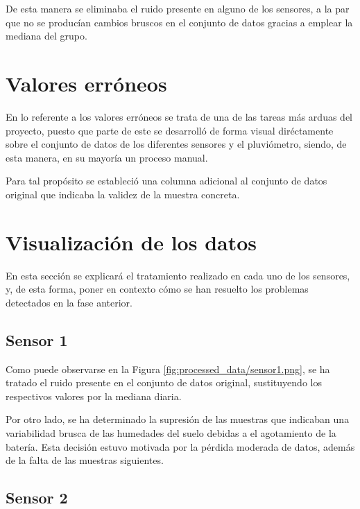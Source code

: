 
De esta manera se eliminaba el ruido presente en alguno de los sensores, a la par 
que no se producían cambios bruscos en el conjunto de datos gracias a emplear la 
mediana del grupo.

\section{Valores erróneos}
En lo referente a los valores erróneos se trata de una de las tareas más arduas 
del proyecto, puesto que parte de este se desarrolló de forma visual diréctamente
sobre el conjunto de datos de los diferentes sensores y el pluviómetro, siendo, 
de esta manera, en su mayoría un proceso manual.

Para tal propósito se estableció una columna adicional al conjunto de datos original
que indicaba la validez de la muestra concreta.

\section{Visualización de los datos}
En esta sección se explicará el tratamiento realizado en cada uno de los sensores, y,
de esta forma, poner en contexto cómo se han resuelto los problemas detectados
en la fase anterior.

\subsection{Sensor 1}

Como puede observarse en la Figura \ref{fig:processed_data/sensor1.png}, 
se ha tratado el ruido presente en el conjunto de datos original, sustituyendo los 
respectivos valores por la mediana diaria.

Por otro lado, se ha determinado la supresión de las muestras que indicaban una 
variabilidad brusca de las humedades del suelo debidas a el agotamiento de la batería.
Esta decisión estuvo motivada por la pérdida moderada de datos, además de la 
falta de las muestras siguientes.

\newpage

\subsection{Sensor 2}

